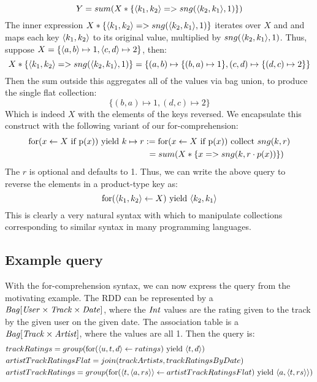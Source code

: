 {{{{\[ Y = sum(X*\{\langle k_1, k_2 \rangle => sng(\langle k_2, k_1 \rangle,1)\}) \]
The inner expression $X*\{\langle k_1, k_2 \rangle => sng(\langle k_2, k_1 \rangle,1)\}$ iterates over $X$ and and maps each key $\langle k_1, k_2 \rangle$ to its original value, multiplied by $sng(\langle k_2, k_1 \rangle,1)$. Thus, suppose $X = \{\langle a, b \rangle \mapsto 1, \langle c, d \rangle \mapsto 2\}$, then:
\begin{equation*}
X*\{\langle k_1, k_2 \rangle => sng(\langle k_2, k_1 \rangle,1)\} = \{(a,b) \mapsto \{(b,a) \mapsto 1\}, (c,d) \mapsto \{(d,c) \mapsto 2\}\}
\end{equation*}
Then the sum outside this aggregates all of the values via bag union, to produce the single flat collection:
\begin{equation*}
\{(b,a) \mapsto 1, (d,c) \mapsto 2\}
\end{equation*}
Which is indeed $X$ with the elements of the keys reversed. We encapsulate this construct with the following variant of our for-comprehension: 
\begin{equation*}
\begin{split}
\textrm{for}(x \leftarrow X \textrm{ if p}(x)) \textrm{ yield } k \mapsto r &:= \textrm{for}(x \leftarrow X \textrm{ if p}(x)) \textrm{ collect } sng(k,r) \\
& \ = sum(X * \{x => sng(k,r \cdot p(x)) \})
\end{split}
\end{equation*}
The $r$ is optional and defaults to 1. Thus, we can write the above query to reverse the elements in a product-type key as:
\[\textrm{for}(\langle k_1, k_2 \rangle \leftarrow X) \textrm{ yield } \langle k_2, k_1 \rangle\]
This is clearly a very natural syntax with which to manipulate collections corresponding to similar syntax in many programming languages.

\subsection{Example query} \label{examplequery}

With the for-comprehension syntax, we can now express the query from the motivating example. The  RDD can be represented by a $\textrm{\textit{Bag}}[\textrm{\textit{User}} \times \textrm{\textit{Track}} \times \textrm{\textit{Date}}]$, where the $\textrm{\textit{Int}}$ values are the rating given to the track by the given user on the given date. The association table is a $\textrm{\textit{Bag}}[\textrm{\textit{Track}} \times \textrm{\textit{Artist}}]$, where the values are all 1. Then the query is:
\begin{equation*}
\begin{split}
&trackRatings = group(\textrm{for}(\langle u,t,d \rangle \leftarrow ratings) \textrm{ yield } \langle t, d \rangle) \\
&artistTrackRatingsFlat = join(trackArtists,trackRatingsByDate) \\
&artistTrackRatings = group( \textrm{for}(\langle t,\langle a,rs \rangle \rangle \leftarrow artistTrackRatingsFlat) \textrm{ yield } \langle a, \langle t,rs \rangle \rangle)
\end{split}
\end{equation*}

}}}}
